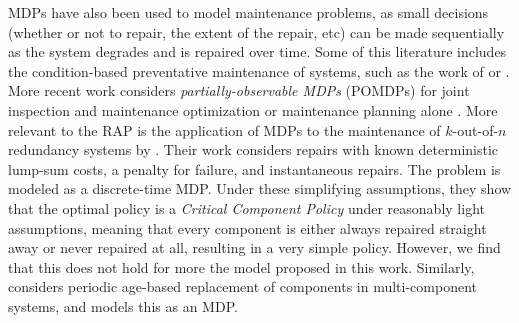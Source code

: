 \documentclass[11pt,authoryear,a4paper]{article}
\theoremstyle{definition}
\begin{document}
MDPs have also been used to model maintenance problems, as small decisions (whether or not to repair, the extent of the repair, etc) can be made sequentially as the system degrades and is repaired over time. Some of this literature includes the condition-based preventative maintenance of systems, such as the work of \cite{chen2005conditionbased} or \cite{amari2006conditionbased}. More recent work considers \emph{partially-observable MDPs} (POMDPs) for joint inspection and maintenance optimization \citep{GUO2022pomdp} or maintenance planning alone \citep{DEEP2023pomdp}. More relevant to the RAP is the application of MDPs to the maintenance of $k$-out-of-$n$ redundancy systems by \cite{flynn2004heuristic}. Their work considers repairs with known deterministic lump-sum costs, a penalty for failure, and instantaneous repairs. The problem is modeled as a discrete-time MDP. Under these simplifying assumptions, they show that the optimal policy is a \emph{Critical Component Policy} under reasonably light assumptions, meaning that every component is either always repaired straight away or never repaired at all, resulting in a very simple policy. However, we find that this does not hold for more the model proposed in this work. Similarly, \cite{ozekici1988replacement} considers periodic age-based replacement of components in multi-component systems, and models this as an MDP.
\end{document}
